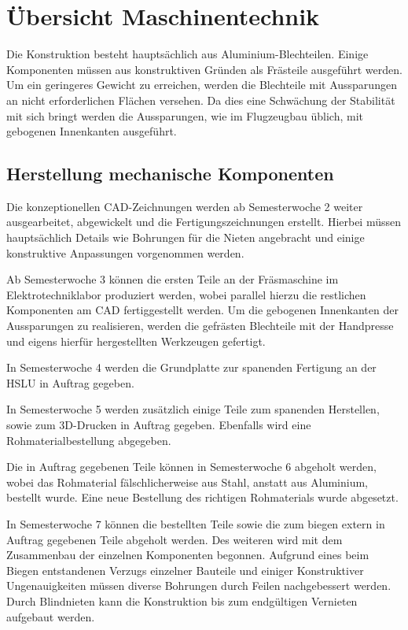 \section{Übersicht Maschinentechnik}
Die Konstruktion besteht hauptsächlich aus Aluminium-Blechteilen. Einige Komponenten müssen aus konstruktiven Gründen als Frästeile ausgeführt werden.
Um ein geringeres Gewicht zu erreichen, werden die Blechteile mit Aussparungen an nicht erforderlichen Flächen versehen. Da dies eine Schwächung der Stabilität mit sich bringt werden die Aussparungen, wie im Flugzeugbau üblich, mit gebogenen Innenkanten ausgeführt. 

\subsection{Herstellung mechanische Komponenten}
Die konzeptionellen CAD-Zeichnungen werden ab Semesterwoche 2 weiter ausgearbeitet, abgewickelt und die Fertigungszeichnungen erstellt. Hierbei müssen hauptsächlich Details wie Bohrungen für die Nieten angebracht und einige konstruktive Anpassungen vorgenommen werden. 

Ab Semesterwoche 3 können die ersten Teile an der Fräsmaschine im Elektrotechniklabor produziert werden, wobei parallel  hierzu die restlichen Komponenten am CAD fertiggestellt werden.
Um die gebogenen Innenkanten der Aussparungen zu realisieren, werden die gefrästen Blechteile mit der Handpresse und eigens hierfür hergestellten Werkzeugen gefertigt.

In Semesterwoche 4 werden die Grundplatte zur spanenden Fertigung an der HSLU in Auftrag gegeben.

In Semesterwoche 5 werden zusätzlich einige Teile zum spanenden Herstellen, sowie zum 3D-Drucken in Auftrag gegeben. Ebenfalls wird eine Rohmaterialbestellung abgegeben.

Die in Auftrag gegebenen Teile können in Semesterwoche 6 abgeholt werden, wobei das  Rohmaterial fälschlicherweise aus Stahl, anstatt aus Aluminium, bestellt wurde. Eine neue Bestellung des richtigen Rohmaterials wurde abgesetzt.

In Semesterwoche 7 können die bestellten Teile sowie die zum biegen extern in Auftrag gegebenen Teile abgeholt werden. Des weiteren wird mit dem Zusammenbau der einzelnen Komponenten begonnen. Aufgrund eines beim Biegen entstandenen Verzugs einzelner Bauteile und einiger Konstruktiver Ungenauigkeiten müssen diverse Bohrungen durch Feilen nachgebessert werden. Durch Blindnieten kann die Konstruktion bis zum endgültigen Vernieten aufgebaut werden.